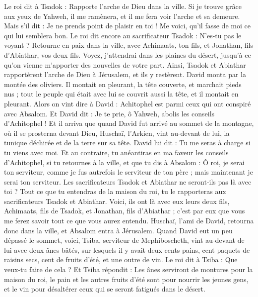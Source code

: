 \begin{multicols}{2}
Le roi dit à Tsadok : Rapporte l'arche de Dieu dans la ville. Si je trouve grâce aux yeux de Yahweh, il me ramènera, et il me fera voir l’arche et sa demeure.
Mais s’il dit : Je ne prends point de plaisir en toi ! Me voici, qu'il fasse de moi ce qui lui semblera bon.
Le roi dit encore au sacrificateur Tsadok : N’es-tu pas le voyant ? Retourne en paix dans la ville, avec Achimaats, ton fils, et Jonathan, fils d'Abiathar, vos deux fils.
Voyez, j’attendrai dans les plaines du désert, jusqu'à ce qu'on vienne m'apporter des nouvelles de votre part.
Ainsi, Tsadok et Abiathar rapportèrent l'arche de Dieu à Jérusalem, et ils y restèrent.
David monta par la montée des oliviers. Il montait en pleurant, la tête couverte, et marchait pieds nus ; tout le peuple qui était avec lui se couvrit aussi la tête, et il montait en pleurant.
Alors on vint dire à David : Achitophel est parmi ceux qui ont conspiré avec Absalom. Et David dit : Je te prie, ô Yahweh, abolis les conseils d'Achitophel !
Et il arriva que quand David fut arrivé au sommet de la montagne, où il se prosterna devant Dieu, Huschaï, l’Arkien, vint au-devant de lui, la tunique déchirée et de la terre sur sa tête.
David lui dit : Tu me seras à charge si tu viens avec moi.
Et au contraire, tu anéantiras en ma faveur les conseils d’Achitophel, si tu retournes à la ville, et que tu dis à Absalom : Ô roi, je serai ton serviteur, comme je fus autrefois le serviteur de ton père ; mais maintenant je serai ton serviteur.
Les sacrificateurs Tsadok et Abiathar ne seront-ils pas là avec toi ? Tout ce que tu entendras de la maison du roi, tu le rapporteras aux sacrificateurs Tsadok et Abiathar.
Voici, ils ont là avec eux leurs deux fils, Achimaats, fils de Tsadok, et Jonathan, fils d'Abiathar ; c’est par eux que vous me ferez savoir tout ce que vous aurez entendu.
Huschaï, l’ami de David, retourna donc dans la ville, et Absalom entra à Jérusalem.
\VerseOne{}Quand David eut un peu dépassé le sommet, voici, Tsiba, serviteur de Mephiboscheth, vint au-devant de lui avec deux ânes bâtés, sur lesquels il y avait deux cents pains, cent paquets de raisins secs, cent de fruits d'été, et une outre de vin.
Le roi dit à Tsiba : Que veux-tu faire de cela ? Et Tsiba répondit : Les ânes serviront de montures pour la maison du roi, le pain et les autres fruits d'été sont pour nourrir les jeunes gens, et le vin pour désaltérer ceux qui se seront fatigués dans le désert.

\end{multicols}
